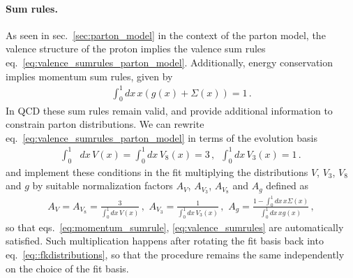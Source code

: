 %
\paragraph{Sum rules.} 
\label{sec:sumrules}
As seen in sec.~\ref{sec:parton_model} in the context of the parton model, the valence structure
of the proton implies the valence sum rules eq.~\eqref{eq:valence_sumrules_parton_model}.
Additionally, energy conservation implies momentum sum rules, given by
\begin{align}
    \label{eq:momentum_sumrule}
    \int_0^1 dx\, x\left(g\left(x\right) + \Sigma\left(x\right)\right) = 1\,. 
\end{align}
In QCD these sum rules remain valid, and provide additional information to constrain parton distributions.
We can rewrite eq.~\eqref{eq:valence_sumrules_parton_model} in terms of the evolution basis
\begin{align}
    \label{eq:valence_sumrules}
    \int_0^1& dx\, V\left(x\right) = \int_0^1 dx\, V_8\left(x\right) = 3\,,   \,\,\,
    \int_0^1 dx\, V_3\left(x\right) = 1\,.
\end{align} 
and implement these conditions in the fit multiplying the distributions $V$, $V_3$, $V_8$ and $g$ by suitable normalization factors
$A_V$, $A_{V_3}$, $A_{V_8}$ and $A_g$ defined as
\begin{align}
    A_V = A_{V_8} = \frac{3}{\int_0^1 dx\, V\left(x\right)}\,,\,\,
    A_{V_3} = \frac{1}{\int_0^1 dx\, V_3\left(x\right)}\,,\,\,
    A_g = \frac{1 - \int_0^1 dx\, x \Sigma\left(x\right)}{\int_0^1 dx\, x g\left(x\right)}\,,
\end{align} 
so that eqs.~\eqref{eq:momentum_sumrule}, \eqref{eq:valence_sumrules} are automatically
satisfied.
Such multiplication happens after rotating the fit basis back into eq.~\eqref{eq::fkdistributions},
so that the procedure remains the same independently on the choice of the fit basis.

